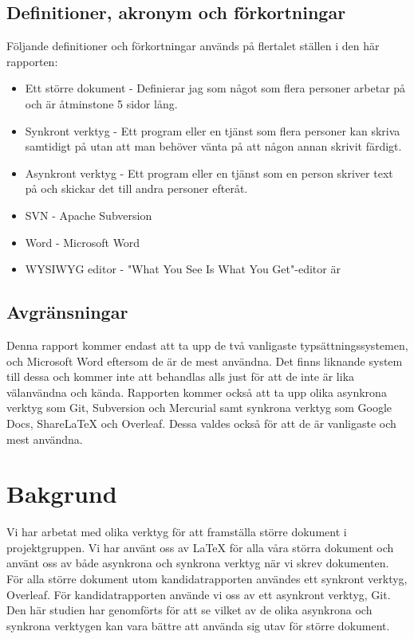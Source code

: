 \subsection{Definitioner, akronym och förkortningar}
Följande definitioner och förkortningar används på flertalet ställen i den här rapporten:
\begin{itemize}
	\item Ett större dokument - Definierar jag som något som flera personer arbetar på och är åtminstone 5 sidor lång.
	\item Synkront verktyg - Ett program eller en tjänst som flera personer kan skriva samtidigt på utan att man behöver vänta på att någon annan skrivit färdigt.
	\item Asynkront verktyg - Ett program eller en tjänst som en person skriver text på och skickar det till andra personer efteråt.
	\item SVN - Apache Subversion
	\item Word - Microsoft Word
	\item WYSIWYG editor - "What You See Is What You Get"-editor är 
\end{itemize}

\subsection{Avgränsningar}
Denna rapport kommer endast att ta upp de två vanligaste typsättningssystemen, \latex och Microsoft Word eftersom de är de mest användna. Det finns liknande system till dessa och kommer inte att behandlas alls just för att de inte är lika välanvändna och kända. Rapporten kommer också att ta upp olika asynkrona verktyg som Git, Subversion och Mercurial samt synkrona verktyg som Google Docs, ShareLaTeX och Overleaf. Dessa valdes också för att de är vanligaste och mest användna.

\section{Bakgrund}
\label{sec:background-tuhkala}
Vi har arbetat med olika verktyg för att framställa större dokument i projektgruppen. Vi har använt oss av LaTeX för alla våra störra dokument och använt oss av både asynkrona och synkrona verktyg när vi skrev dokumenten. För alla större dokument utom kandidatrapporten användes ett synkront verktyg, Overleaf. För kandidatrapporten använde vi oss av ett asynkront verktyg, Git. Den här studien har genomförts för att se vilket av de olika asynkrona och synkrona verktygen kan vara bättre att använda sig utav för större dokument. 

